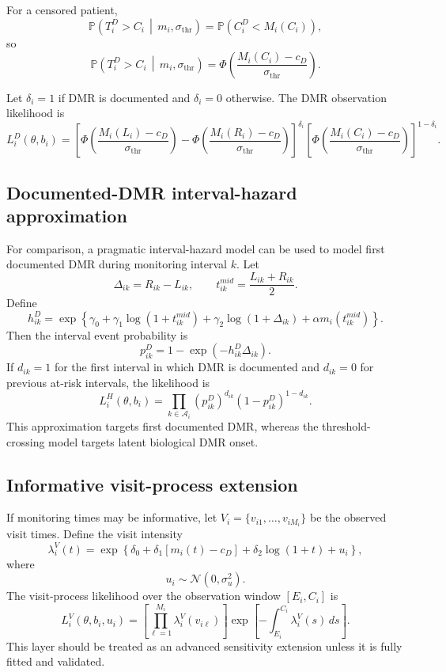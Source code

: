\documentclass[11pt]{article}
\theoremstyle{remark}
\newcommand{\Normal}{\mathcal{N}}
\newcommand{\Prob}{\mathbb{P}}
\newcommand{\given}{\,\middle|\,}
\newcommand{\PhiStd}{\Phi}
\begin{document}
For a censored patient,
\[
\Prob(T_i^D>C_i\given m_i,\sigma_{\mathrm{thr}})
=
\Prob(C_i^D<M_i(C_i)),
\]
so
\[
\Prob(T_i^D>C_i\given m_i,\sigma_{\mathrm{thr}})
=
\PhiStd
\left(
\frac{M_i(C_i)-c_D}{\sigma_{\mathrm{thr}}}
\right).
\]

Let \(\delta_i=1\) if DMR is documented and \(\delta_i=0\) otherwise. The DMR observation likelihood is
\[
L_i^{D}(\theta,b_i)
=
\left[
\PhiStd
\left(
\frac{M_i(L_i)-c_D}{\sigma_{\mathrm{thr}}}
\right)
-
\PhiStd
\left(
\frac{M_i(R_i)-c_D}{\sigma_{\mathrm{thr}}}
\right)
\right]^{\delta_i}
\left[
\PhiStd
\left(
\frac{M_i(C_i)-c_D}{\sigma_{\mathrm{thr}}}
\right)
\right]^{1-\delta_i}.
\]

\subsection{Documented-DMR interval-hazard approximation}

For comparison, a pragmatic interval-hazard model can be used to model first documented DMR during monitoring interval \(k\). Let
\[
\Delta_{ik}=R_{ik}-L_{ik},
\qquad
t_{ik}^{mid}=\frac{L_{ik}+R_{ik}}{2}.
\]
Define
\[
h_{ik}^{D}
=
\exp
\left\{
\gamma_0
+
\gamma_1\log(1+t_{ik}^{mid})
+
\gamma_2\log(1+\Delta_{ik})
+
\alpha m_i(t_{ik}^{mid})
\right\}.
\]
Then the interval event probability is
\[
p_{ik}^{D}
=
1-\exp(-h_{ik}^{D}\Delta_{ik}).
\]
If \(d_{ik}=1\) for the first interval in which DMR is documented and \(d_{ik}=0\) for previous at-risk intervals, the likelihood is
\[
L_i^{H}(\theta,b_i)
=
\prod_{k\in\mathcal{A}_i}
(p_{ik}^{D})^{d_{ik}}
(1-p_{ik}^{D})^{1-d_{ik}}.
\]
This approximation targets first documented DMR, whereas the threshold-crossing model targets latent biological DMR onset.

\subsection{Informative visit-process extension}

If monitoring times may be informative, let \(V_i=\{v_{i1},\ldots,v_{iM_i}\}\) be the observed visit times. Define the visit intensity
\[
\lambda_i^V(t)
=
\exp
\left\{
\delta_0
+
\delta_1[m_i(t)-c_D]
+
\delta_2\log(1+t)
+
u_i
\right\},
\]
where
\[
u_i\sim \Normal(0,\sigma_u^2).
\]
The visit-process likelihood over the observation window \([E_i,C_i]\) is
\[
L_i^V(\theta,b_i,u_i)
=
\left[
\prod_{\ell=1}^{M_i}
\lambda_i^V(v_{i\ell})
\right]
\exp
\left[
-
\int_{E_i}^{C_i}
\lambda_i^V(s)\,ds
\right].
\]
This layer should be treated as an advanced sensitivity extension unless it is fully fitted and validated.
\end{document}
